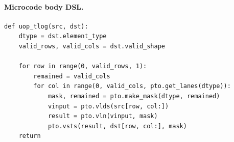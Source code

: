 \paragraph{Microcode body DSL.}
\begin{lstlisting}[style=ptocode]
def uop_tlog(src, dst):
    dtype = dst.element_type
    valid_rows, valid_cols = dst.valid_shape

    for row in range(0, valid_rows, 1):
        remained = valid_cols
        for col in range(0, valid_cols, pto.get_lanes(dtype)):
            mask, remained = pto.make_mask(dtype, remained)
            vinput = pto.vlds(src[row, col:])
            result = pto.vln(vinput, mask)
            pto.vsts(result, dst[row, col:], mask)
    return
\end{lstlisting}
\Needspace{0.34\textheight}

